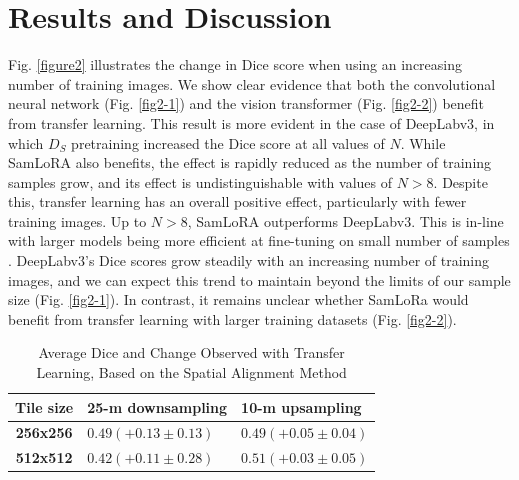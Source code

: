 \documentclass[journal]{IEEEtran}
\begin{document}
\section{Results and Discussion} 
Fig. \ref{figure2} illustrates the change in Dice score when using an increasing number of training images. We show clear evidence that both the convolutional neural network (Fig. \ref{fig2-1}) 
and the vision transformer (Fig. \ref{fig2-2}) benefit from transfer learning. This result is more evident in the case of DeepLabv3, in which $\mathit{D}_S$ pretraining increased
the Dice score at all values of \( N \). While SamLoRA also benefits, the effect is rapidly reduced as the number of training samples grow, and its effect is undistinguishable with values 
of \( N > 8 \). Despite this, transfer learning has an overall positive effect, particularly with fewer training images. Up to \( N > 8 \), SamLoRA outperforms DeepLabv3. This is in-line with 
larger models being more efficient at fine-tuning on small number of samples \cite{zhaiScalingVisionTransformers2022}. DeepLabv3's Dice scores grow steadily with an increasing number of training images, 
and we can expect this trend to maintain beyond the limits of our sample size (Fig. \ref{fig2-1}). In contrast, it remains unclear whether SamLoRa would benefit from transfer learning with larger training datasets 
(Fig. \ref{fig2-2}).
\begin{table}[t]
    \caption{Average Dice and Change Observed with Transfer Learning, Based on the Spatial Alignment Method\label{table2}}
    \centering
    \begin{tabular}{c>{\centering\arraybackslash}m{3cm}>{\centering\arraybackslash}m{2.6cm}}
    \toprule
    \textbf{Tile size} & \textbf{25-m downsampling} & \textbf{10-m upsampling} \\
    \midrule
    \textbf{256x256} & $0.49 (+0.13 \pm 0.13)$ & $0.49 (+0.05 \pm 0.04)$ \\
    \textbf{512x512} & $0.42 (+0.11 \pm 0.28)$ & $0.51 (+0.03 \pm 0.05)$ \\
    \bottomrule
    \end{tabular}
\end{table}
\end{document}

